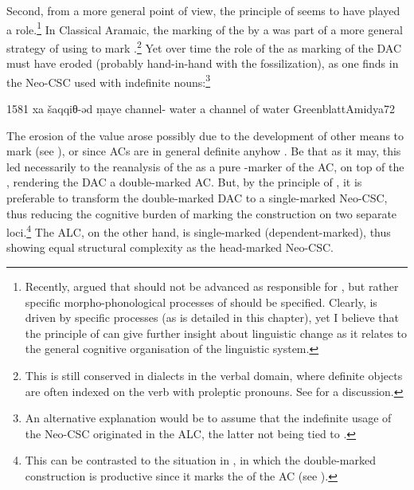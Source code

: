 \largerpage[-2]
Second, from a more general point of view, the principle of  seems to have played a role.\footnote{Recently, \citet{Cristofaro} argued that  should not be advanced as responsible for , but rather specific morpho-phonological processes of  should be specified. Clearly,   is driven by specific processes (as is detailed in this chapter), yet I believe that the principle of  can give further insight about linguistic change as it relates to the general cognitive organisation of the linguistic system.}  In Classical Aramaic, the marking of the \prim by a  was part of a more general strategy of using  to mark .\footnote{This is still conserved in  dialects in the verbal domain, where definite objects are often indexed on the verb with proleptic pronouns. See \citet{CoghillDOM} for a discussion.} Yet  over time the role of the  as marking  of the DAC must have eroded (probably hand-in-hand with the fossilization), as one finds in  the Neo-CSC used with indefinite nouns:\footnote{An alternative explanation would be to assume that the indefinite usage of the Neo-CSC originated in the ALC, the latter not being tied to .} 

  
{1581}
{xa šaqqiθ-əd ṃaye}
{\indef{} channel-\cst{} water}
{a channel of water}
{GreenblattAmidya}{72}

The erosion of the  value arose possibly due to the development of other means to mark  (see ), or since ACs are in general definite anyhow \citep[cf.][231]{HaspelmathArticle}. Be that as it may, this led necessarily to the reanalysis of the  as a pure \prim-marker of the AC, on top of the \lnk*, rendering the DAC a double-marked AC. But, by the principle of , it is preferable to transform the  double-marked DAC to a single-marked Neo-CSC, thus reducing the cognitive burden of marking the construction on two separate {loci}.\footnote{This can be contrasted to the situation in \Turk, in which the double-marked construction is productive since it marks the  of the AC (see ).} The ALC, on the other hand, is single-marked (dependent-marked), thus showing equal structural complexity as the head-marked Neo-CSC.  

